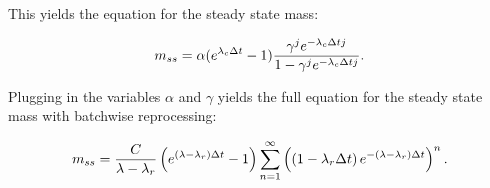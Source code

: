 This yields the equation for the steady state mass:

\begin{equation} \hfill
m_{ss} = \alpha (e^{\lambda_c \Delta t} - 1) \frac{\gamma^j e^{-\lambda_c \Delta t j}}{1 - \gamma^j e^{-\lambda_c \Delta t j}}.
\hfill \end{equation}

Plugging in the variables $\alpha$ and $\gamma$ yields the full equation for the steady state mass with batchwise reprocessing:

\begin{equation} \hfill 
m_{ss} =  \frac{C}{\lambda - \lambda_r} \left(e^{(\lambda - \lambda_r) \Delta t} - 1 \right) \sum_{n=1}^{\infty} \left( \left(1 - \lambda_r \Delta t \right) e^{-(\lambda - \lambda_r) \Delta t} \right)^n.
\hfill \end{equation}


